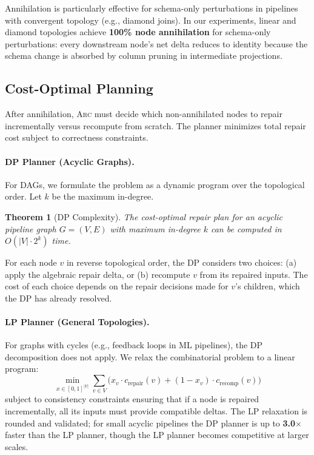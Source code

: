\documentclass[sigplan,screen,nonacm]{acmart}
\newcommand{\arc}{\textsc{Arc}\xspace}
\newtheorem{theorem}{Theorem}
\begin{document}
Annihilation is particularly effective for schema-only perturbations
in pipelines with convergent topology (e.g., diamond joins).
In our experiments, linear and diamond topologies achieve
\textbf{100\% node annihilation} for schema-only perturbations:
every downstream node's net delta reduces to identity because the
schema change is absorbed by column pruning in intermediate projections.

\subsection{Cost-Optimal Planning}\label{sec:planning}

After annihilation, \arc must decide which non-annihilated nodes to
repair incrementally versus recompute from scratch.  The planner
minimizes total repair cost subject to correctness constraints.

\paragraph{DP Planner (Acyclic Graphs).}
For DAGs, we formulate the problem as a dynamic program over
the topological order.  Let $k$ be the maximum in-degree.

\begin{theorem}[DP Complexity]
The cost-optimal repair plan for an acyclic pipeline graph $G = (V,E)$
with maximum in-degree $k$ can be computed in $O(|V| \cdot 2^k)$ time.
\end{theorem}

For each node $v$ in reverse topological order, the DP considers
two choices: (a) apply the algebraic repair delta, or (b) recompute $v$
from its repaired inputs.  The cost of each choice depends on the
repair decisions made for $v$'s children, which the DP has already
resolved.

\paragraph{LP Planner (General Topologies).}
For graphs with cycles (e.g., feedback loops in ML pipelines), the
DP decomposition does not apply.  We relax the combinatorial problem
to a linear program:
\[
  \min_{x \in [0,1]^{|V|}} \sum_{v \in V} \bigl(
    x_v \cdot c_{\mathrm{repair}}(v)
    + (1-x_v) \cdot c_{\mathrm{recomp}}(v) \bigr)
\]
subject to consistency constraints ensuring that if a node is repaired
incrementally, all its inputs must provide compatible deltas.  The LP
relaxation is rounded and validated; for small acyclic pipelines
the DP planner is up to \textbf{3.0$\times$} faster than the LP planner,
though the LP planner becomes competitive at larger scales.
\end{document}
